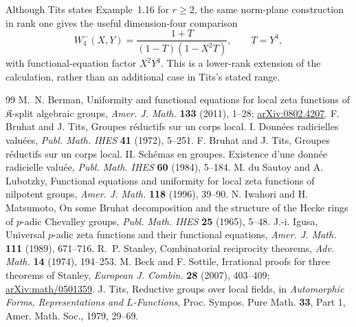 \documentclass[11pt,a4paper]{article}
\theoremstyle{definition}
\begin{document}
Although Tits states Example~1.16 for $r\geq2$, the same norm-plane
construction in rank one gives the useful dimension-four comparison
\[
 W_4^-(X,Y)=\frac{1+T}{(1-T)(1-X^2T)},\qquad T=Y^4,
\]
with functional-equation factor $X^2Y^4$. This is a lower-rank
extension of the calculation, rather than an additional case in
Tits's stated range.



\begin{thebibliography}{99}
\footnotesize
\setlength{\itemsep}{2pt}
 M.~N. Berman, Uniformity and functional equations for local
zeta functions of $\mathfrak K$-split algebraic groups,
\emph{Amer. J. Math.} \textbf{133} (2011), 1--28;
\href{https://arxiv.org/abs/0802.4207}{arXiv:0802.4207}.
 F. Bruhat and J. Tits, Groupes r\'eductifs sur un corps
local. I. Donn\'ees radicielles valu\'ees,
\emph{Publ. Math. IHES} \textbf{41} (1972), 5--251.
 F. Bruhat and J. Tits, Groupes r\'eductifs sur un corps
local. II. Sch\'emas en groupes. Existence d'une donn\'ee radicielle
valu\'ee, \emph{Publ. Math. IHES} \textbf{60} (1984), 5--184.
 M. du Sautoy and A. Lubotzky, Functional equations and
uniformity for local zeta functions of nilpotent groups,
\emph{Amer. J. Math.} \textbf{118} (1996), 39--90.
 N. Iwahori and H. Matsumoto, On some Bruhat decomposition
and the structure of the Hecke rings of $p$-adic Chevalley groups,
\emph{Publ. Math. IHES} \textbf{25} (1965), 5--48.
 J.-i. Igusa, Universal $p$-adic zeta functions and their
functional equations, \emph{Amer. J. Math.} \textbf{111} (1989), 671--716.
 R.~P. Stanley, Combinatorial reciprocity theorems,
\emph{Adv. Math.} \textbf{14} (1974), 194--253.
 M. Beck and F. Sottile, Irrational proofs for three
theorems of Stanley, \emph{European J. Combin.} \textbf{28} (2007),
403--409; \href{https://arxiv.org/abs/math/0501359}{arXiv:math/0501359}.
 J. Tits, Reductive groups over local fields, in
\emph{Automorphic Forms, Representations and $L$-Functions},
Proc. Sympos. Pure Math. \textbf{33}, Part 1,
Amer. Math. Soc., 1979, 29--69.
\end{thebibliography}
\end{document}
